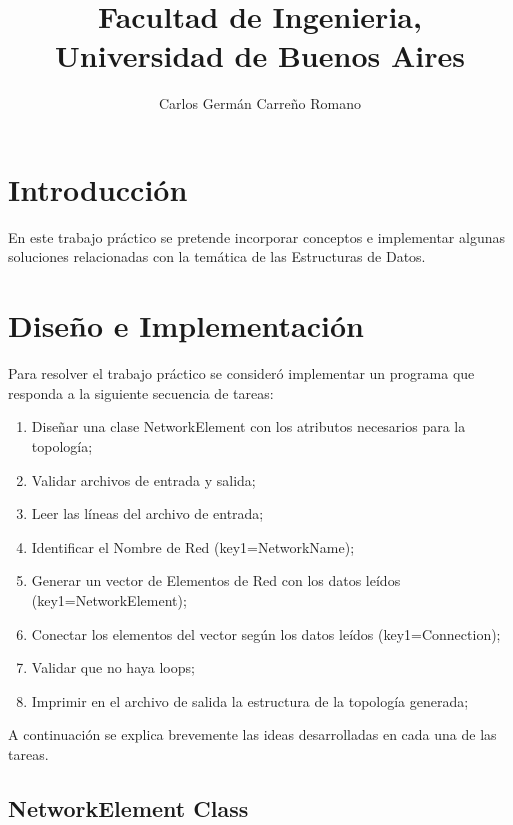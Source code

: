 \documentclass[10pt,a4paper]{article}
\title{Facultad de Ingenieria,\\
 Universidad de Buenos Aires\\}
\author{Carlos Germán Carreño Romano}
\begin{document}
\maketitle
\newpage
\tableofcontents
\newpage


\section{Introducción}

En este trabajo práctico se pretende incorporar conceptos e implementar algunas soluciones relacionadas con la temática de las Estructuras de Datos. 


\section{Diseño e Implementación}

Para resolver el trabajo práctico se consideró implementar un programa que responda a la siguiente secuencia de tareas:
\begin{enumerate}
\item Diseñar una clase NetworkElement con los atributos necesarios para la topología;
\item Validar archivos de entrada y salida;
\item Leer las líneas del archivo de entrada;
\item Identificar el Nombre de Red (key1=NetworkName);
\item Generar un vector de Elementos de Red con los datos leídos (key1=NetworkElement);
\item Conectar los elementos del vector según los datos leídos (key1=Connection);
\item Validar que no haya loops;
\item Imprimir en el archivo de salida la estructura de la topología generada;
\end{enumerate}
A continuación se explica brevemente las ideas desarrolladas en cada una de las tareas.


\subsection{NetworkElement Class}
\end{document}
